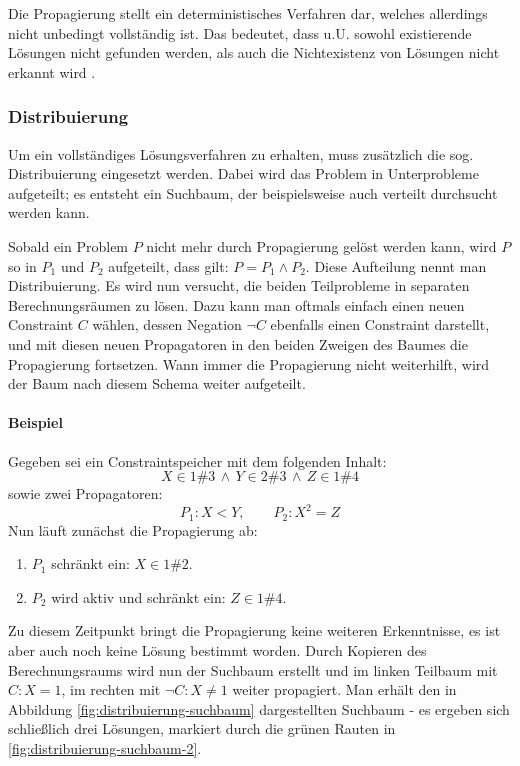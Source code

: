Die Propagierung stellt ein deterministisches Verfahren dar, welches allerdings 
nicht unbedingt vollständig ist. Das bedeutet, dass u.U. sowohl existierende 
Lösungen nicht gefunden werden, als auch die Nichtexistenz von Lösungen nicht 
erkannt wird \cite{KI-LP96}.

\subsubsection{Distribuierung}
Um ein vollständiges Lösungsverfahren zu erhalten, muss zusätzlich die sog.
Distribuierung eingesetzt werden. Dabei wird das Problem in Unterprobleme
aufgeteilt; es entsteht ein Suchbaum, der beispielsweise auch verteilt
durchsucht werden kann.

Sobald ein Problem $P$ nicht mehr durch Propagierung gelöst werden kann, wird 
$P$ so in $P_1$ und $P_2$ aufgeteilt, dass gilt: $P = P_1 \wedge P_2$. Diese 
Aufteilung nennt man Distribuierung. Es wird nun versucht, die beiden 
Teilprobleme in separaten Berechnungsräumen zu lösen. Dazu kann man oftmals 
einfach einen neuen Constraint $C$ wählen, dessen Negation $\neg C$ ebenfalls 
einen Constraint darstellt, und mit diesen neuen Propagatoren in den beiden 
Zweigen des Baumes die Propagierung fortsetzen. Wann immer die Propagierung 
nicht weiterhilft, wird der Baum nach diesem Schema weiter aufgeteilt.

\paragraph{Beispiel} Gegeben sei ein Constraintspeicher mit dem folgenden
Inhalt: $$X \in 1\#3 \, \wedge \, Y \in 2\#3 \, \wedge \, Z \in 1\#4$$ sowie
zwei Propagatoren: $$P_1: X < Y, \qquad P_2: X^2 = Z$$
Nun läuft zunächst die Propagierung ab:

\begin{enumerate}
  \item $P_1$ schränkt ein: $X \in 1\#2$.
  \item $P_2$ wird aktiv und schränkt ein: $Z \in 1\#4$.
\end{enumerate}

Zu diesem Zeitpunkt bringt die Propagierung keine weiteren Erkenntnisse, es ist 
aber auch noch keine Lösung bestimmt worden. Durch Kopieren des 
Berechnungsraums wird nun der Suchbaum erstellt und im linken Teilbaum mit $C: 
X = 1$, im rechten mit $\neg C: X \neq 1$ weiter propagiert. Man erhält den in 
Abbildung \ref{fig:distribuierung-suchbaum} dargestellten Suchbaum - es ergeben 
sich schließlich drei Lösungen, markiert durch die grünen Rauten in 
\ref{fig:distribuierung-suchbaum-2}.

